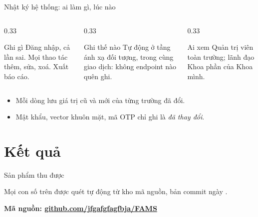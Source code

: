 \documentclass[aspectratio=169, 11pt]{beamer}
\begin{document}
\begin{frame}{Nhật ký hệ thống: ai làm gì, lúc nào}
  \begin{columns}[T]
    \begin{column}{0.33\textwidth}
      \begin{block}{Ghi gì}
        Đăng nhập, cả lần sai. Mọi thao tác thêm, sửa, xoá. Xuất báo cáo.
      \end{block}
    \end{column}
    \begin{column}{0.33\textwidth}
      \begin{block}{Ghi thế nào}
        Tự động ở tầng ánh xạ đối tượng, trong cùng giao dịch: không
        endpoint nào quên ghi.
      \end{block}
    \end{column}
    \begin{column}{0.33\textwidth}
      \begin{block}{Ai xem}
        Quản trị viên toàn trường; lãnh đạo Khoa phần của Khoa mình.
      \end{block}
    \end{column}
  \end{columns}
  \vfill
  \begin{itemize}
    \item Mỗi dòng lưu giá trị cũ và mới của từng trường đã đổi.
    \item Mật khẩu, vector khuôn mặt, mã OTP chỉ ghi là \emph{đã thay đổi}.
  \end{itemize}
\end{frame}

\section{Kết quả}

\begin{frame}{Sản phẩm thu được}
  \begin{center}
     \hfill
     \hfill

    \vspace{0.7cm}

     \hfill
     \hfill
  \end{center}
  \vfill
  {\small\color{gray500} Mọi con số trên được quét tự động từ kho mã nguồn,
  bản commit \code{\FcommitCuoi} ngày \FngayCommit.}

  \vspace{4pt}
  {\small\bfseries Mã nguồn:
  \href{https://github.com/jfgafgfagfbja/FAMS}{\color{daumaroon}github.com/jfgafgfagfbja/FAMS}}
\end{frame}
\end{document}

